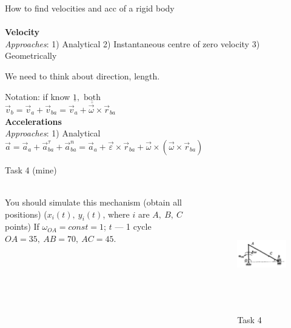 \documentclass[aspectratio=169,xcolor=table,10pt, notes=hide]{beamer}
\begin{document}
\begin{frame}[t]{How to find velocities and acc of a rigid body}
    \framesubtitle{}
    \textbf{Velocity} \\
    \textit{Approaches}:
    1) Analytical 2) Instantaneous centre of zero velocity 3) Geometrically
    \medskip

    We need to think about direction, length.

    Notation: if know $\underline{1}, \underline{\underline{\text { both }}}$ \\
    $\vec{v}_b=\vec{v}_a+\vec{v}_{b a}=\vec{v}_a+\vec{\omega} \times \vec{r}_{b a}$\\
    \textbf{Accelerations} \\
    \textit{Approaches}: 1) Analytical \\
    $
        \vec{a}=\vec{a}_a+\vec{a}_{b a}^\tau+\vec{a}_{b a}^n=\vec{a}_a+\vec{\varepsilon} \times \vec{r}_{b a}+\vec{\omega} \times\left(\vec{\omega} \times \vec{r}_{b a}\right)
    $
\end{frame}


\begin{frame}[t]{Task 4 (mine)}
    \framesubtitle{}
    \begin{columns}[c,onlytextwidth]
        \begin{column}{0.59\textwidth}
            You should simulate this mechanism (obtain all positions) ($x_i(t),\ y_i(t)$, where $i$ are $A,\ B,\ C$ points)
            \medskip
            If $\omega_{OA} = const = 1$; $t$ --- 1 cycle \\
            $OA = 35,\ AB=70,\ AC=45$.
        \end{column}
        \begin{column}{0.39\textwidth}
            \begin{figure}[H]
                \centering\includegraphics[height=5cm,width=1\textwidth,keepaspectratio]{image21.png}
                \caption*{Task 4}
                \label{fig:image21.png}
            \end{figure}
        \end{column}
    \end{columns}
\end{frame}
\end{document}

